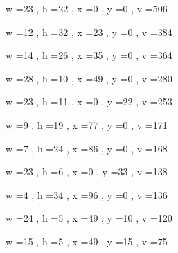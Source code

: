 \documentclass[11pt]{article}
\begin{document}
w =23 , h =22 , x =0 , y =0 , v =506
\par
w =12 , h =32 , x =23 , y =0 , v =384
\par
w =14 , h =26 , x =35 , y =0 , v =364
\par
w =28 , h =10 , x =49 , y =0 , v =280
\par
w =23 , h =11 , x =0 , y =22 , v =253
\par
w =9 , h =19 , x =77 , y =0 , v =171
\par
w =7 , h =24 , x =86 , y =0 , v =168
\par
w =23 , h =6 , x =0 , y =33 , v =138
\par
w =4 , h =34 , x =96 , y =0 , v =136
\par
w =24 , h =5 , x =49 , y =10 , v =120
\par
w =15 , h =5 , x =49 , y =15 , v =75
\par
\newpage
\end{document}
